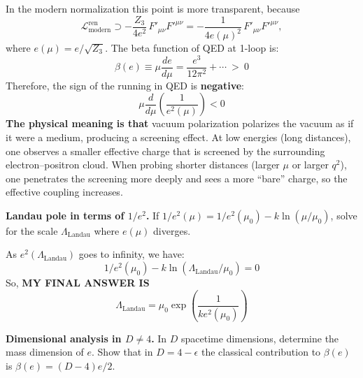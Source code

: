 \begin{solution}[22.5]
	In the modern normalization this point is more transparent, because
	\[
	\mathcal{L}_{\text{modern}}^{\text{ren}} \supset -\frac{Z_3}{4e^2}\,F'_{\mu\nu}F'^{\mu\nu}
	= -\frac{1}{4e(\mu)^2}\,F'_{\mu\nu}F'^{\mu\nu},
	\]
	where \(e(\mu)=e/\sqrt{Z_3}\). The beta function of QED at 1-loop is:
	\[
	\beta(e)\equiv\mu\frac{de}{d\mu}=\frac{e^3}{12\pi^2}+\cdots\mathrm{~>~}0
	\]
	Therefore, the sign of the running in QED is \textbf{negative}:
	\[
	\boxed{\mu\frac{d}{d\mu}{\left(\frac{1}{e^2(\mu)}\right)}<0}
	\]
	\textbf{The physical meaning is that} vacuum polarization polarizes the vacuum as if it were a medium, producing a screening effect. 
	At low energies (long distances), one observes a smaller effective charge that is screened by the surrounding electron--positron cloud. 
	When probing shorter distances (larger $\mu$ or larger $q^2$), one penetrates the screening more deeply and sees a more ``bare'' charge, so the effective coupling increases.
\end{solution}
\begin{problem}
    \textbf{Landau pole in terms of \(1/e^2\).} If \(1/e^2(\mu)=1/e^2(\mu_0)-k\ln(\mu/\mu_0)\), solve for the scale \(\Lambda_{\text{Landau}}\) where \(e(\mu)\) diverges.
\end{problem}
\begin{solution}[22.6]
	As $e^2(\Lambda_{\text{Landau}})$ goes to infinity, we have:
	\[
	1/e^2(\mu_0)-k\ln(\Lambda_{\text{Landau}}/\mu_0)=0
	\]
	So, \textbf{MY FINAL ANSWER IS}
	\[
	\boxed{
	\Lambda_{\text{Landau}}=\mu_0\exp\left(\frac{1}{ke^2(\mu_0)}\right)
	}
	\]
\end{solution}
\begin{problem}
    \textbf{Dimensional analysis in \(D\neq4\).} In \(D\) spacetime dimensions, determine the mass dimension of \(e\). Show that in \(D=4-\epsilon\) the classical contribution to \(\beta(e)\) is \(\beta(e)=(D-4)e/2\).
\end{problem}
